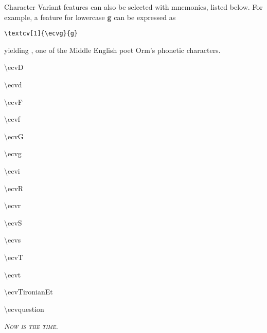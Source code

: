\documentclass[12pt]{article}
\begin{document}
Character Variant features can also be selected with mnemonics, listed below. For example, a feature for
lowercase \textbf{g} can be expressed as

\begin{center}
{\verb|\textcv[1]{\ecvg}{g}|}
\end{center}

\noindent yielding \textbf{}, one of the Middle English poet Orm’s phonetic characters.

\begin{multicols}{3}
    \textbackslash ecvD

    \textbackslash ecvd

    \textbackslash ecvF

    \textbackslash ecvf

    \textbackslash ecvG

    \textbackslash ecvg

    \textbackslash ecvi

    \textbackslash ecvR

    \textbackslash ecvr

    \textbackslash ecvS

    \textbackslash ecvs

    \textbackslash ecvT

    \textbackslash ecvt

    \textbackslash ecvTironianEt

    \textbackslash ecvquestion
\end{multicols}

\textit{\textsc{Now is the time.}}
\end{document}
